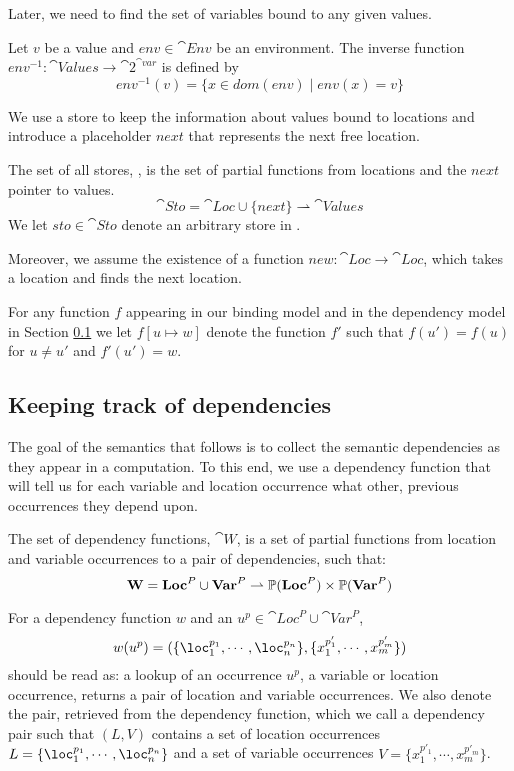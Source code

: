 \documentclass[acmsmall,sigplan]{acmart}
\begin{document}
Later, we need to find the set of variables bound to any given
values. 
\begin{definition}
  Let $v$ be a value and $env\in\cat{Env}$ be an environment. The
  inverse function $env^{-1} : \cat{Values} \to \cat{2}^{\cat{var}}$
  is defined by
	\[ env^{-1}(v)=\{x\in dom(env)\mid env(x)=v\} \]
\end{definition}
%
We use a store to keep the information about values bound to locations
and introduce a placeholder $next$ that represents the next free location.

\begin{definition}
	The set of all stores, , is the set of partial functions from locations and the $next$ pointer to values.
\[ \cat{Sto}=\cat{Loc}\cup\{next\}\rightharpoonup\cat{Values} \]
We let $sto\in\cat{Sto}$ denote an arbitrary store in .
\end{definition}

Moreover, we assume the existence of a function
$new:\cat{Loc}\rightarrow\cat{Loc}$, which takes a location and finds
the next location.

For any function $f$ appearing in our binding model and in the
dependency model in Section \ref{sec:DepFunc} we let $f[u
\mapsto w]$ denote the function $f'$ such that $f(u') = f(u)$ for $u
\neq u'$ and $f'(u') = w$.

\subsection{Keeping track of dependencies}\label{sec:DepFunc}

The goal of the semantics that follows is to collect the semantic
dependencies as they appear in a computation. To this end, we use a
dependency function that will tell us for each variable and location
occurrence what other, previous occurrences they depend upon.

\begin{definition}\label{def:DepFunc}
	The set of dependency functions, $\cat{W}$, is a set of partial functions from location and variable occurrences to a pair of dependencies, such that:
\[
  \textbf{W}=\textbf{Loc}^P\cup\textbf{Var}^P\rightharpoonup\mathbb{P}(\textbf{Loc}^P)\times\mathbb{P}(\textbf{Var}^P) \] 
\end{definition}
For a dependency function $w$ and an
$u^p\in\cat{Loc}^P\cup\cat{Var}^P$,
%
\[ w (u^p)=(\{\loc_1^{p_1},\cdots,\loc_n^{p_n}\},\{x_1^{p'_1},\cdots,x_m^{p'_m}\}) \]
%
should be read as: a lookup of an occurrence $u^p$, a variable or
location occurrence, returns a pair of location and variable
occurrences. 
We also denote the pair, retrieved from the dependency function, which
we call a dependency pair such that $(L,V)$ contains a set of location
occurrences $L=\{\loc_1^{p_1},\cdots,\loc_n^{p_n}\}$  
and a set of variable occurrences $V=\{x_1^{p'_1},\cdots,x_m^{p'_m}\}$.
\end{document}
